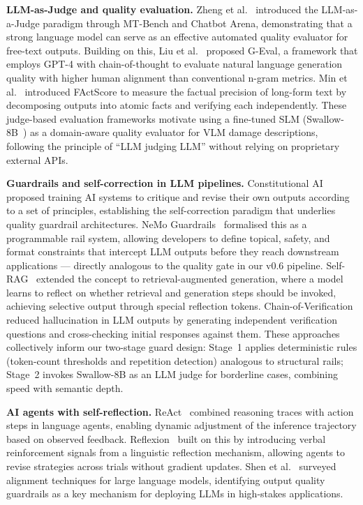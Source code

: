 \documentclass[twocolumn]{article}
\begin{document}
\textbf{LLM-as-Judge and quality evaluation.}
Zheng et al.~\cite{zheng2023judge} introduced the LLM-as-a-Judge paradigm
through MT-Bench and Chatbot Arena, demonstrating that a strong language
model can serve as an effective automated quality evaluator for free-text
outputs.
Building on this, Liu et al.~\cite{liu2023geval} proposed G-Eval, a
framework that employs GPT-4 with chain-of-thought to evaluate natural
language generation quality with higher human alignment than conventional
n-gram metrics.
Min et al.~\cite{min2023factscore} introduced FActScore to measure the
factual precision of long-form text by decomposing outputs into atomic
facts and verifying each independently.
These judge-based evaluation frameworks motivate using a fine-tuned SLM
(Swallow-8B~\cite{tokyotech2024swallow}) as a domain-aware quality
evaluator for VLM damage descriptions, following the principle of
``LLM judging LLM'' without relying on proprietary external APIs.

\textbf{Guardrails and self-correction in LLM pipelines.}
Constitutional AI~\cite{bai2022constitutional} proposed training AI
systems to critique and revise their own outputs according to a set of
principles, establishing the self-correction paradigm that underlies
quality guardrail architectures.
NeMo Guardrails~\cite{rebedea2023nemo} formalised this as a programmable
rail system, allowing developers to define topical, safety, and format
constraints that intercept LLM outputs before they reach downstream
applications --- directly analogous to the quality gate in our v0.6 pipeline.
Self-RAG~\cite{asai2023selfrag} extended the concept to retrieval-augmented
generation, where a model learns to reflect on whether retrieval and
generation steps should be invoked, achieving selective output through
special reflection tokens.
Chain-of-Verification~\cite{dhuliawala2023chainveri} reduced hallucination
in LLM outputs by generating independent verification questions and
cross-checking initial responses against them.
These approaches collectively inform our two-stage guard design:
Stage~1 applies deterministic rules (token-count thresholds and
repetition detection) analogous to structural rails;
Stage~2 invokes Swallow-8B as an LLM judge for borderline cases,
combining speed with semantic depth.

\textbf{AI agents with self-reflection.}
ReAct~\cite{yao2023react} combined reasoning traces with action steps
in language agents, enabling dynamic adjustment of the inference
trajectory based on observed feedback.
Reflexion~\cite{shinn2023reflexion} built on this by introducing verbal
reinforcement signals from a linguistic reflection mechanism, allowing
agents to revise strategies across trials without gradient updates.
Shen et al.~\cite{shen2023alignment} surveyed alignment techniques for
large language models, identifying output quality guardrails as a key
mechanism for deploying LLMs in high-stakes applications.
\end{document}
